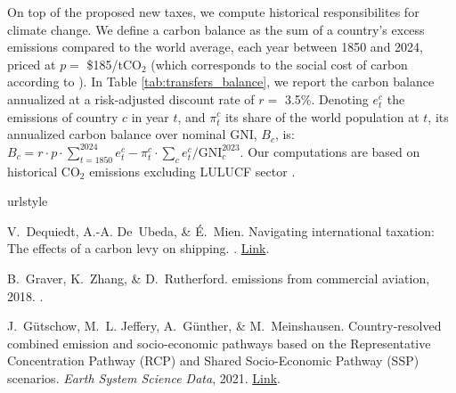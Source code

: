 \documentclass[12pt,english]{article}
\begin{document}
\begin{bibunit}
On top of the proposed new taxes, we compute historical responsibilites for climate change. We define a carbon balance as the sum of a country's excess emissions compared to the world average, each year between 1850 and 2024, priced at $p=$ \$185/tCO$_\text{2}$ (which corresponds to the social cost of carbon according to \citealp{rennert_comprehensive_2022}). 
In Table \ref{tab:transfers_balance}, we report the carbon balance annualized at a risk-adjusted discount rate of $r =$ 3.5\%. Denoting $e_t^c$ the emissions of country $c$ in year $t$, and $\pi_t^c$ its share of the world population at $t$, its annualized carbon balance over nominal GNI, $B_c$, is: $ B_c = r \cdot p \cdot \sum_{t=1850}^{2024} e_t^c - \pi_t^c \cdot \sum_c e_t^c / \text{GNI}_c^{2023}\text{.}$ Our computations are based on historical CO$_\text{2}$ emissions excluding LULUCF sector \citep{gutschow_country-resolved_2021}.

\clearpage
\renewcommand{\url}[1]{\href{#1}{Link}} 

\begin{thebibliography}{7}
\providecommand{\natexlab}[1]{#1}
\providecommand{\url}[1]{\texttt{#1}}
\expandafter\ifx\csname urlstyle\endcsname\relax
  \providecommand{\doi}[1]{doi: #1}\else
  \providecommand{\doi}{doi: \begingroup \urlstyle{rm}\Url}\fi

V.~Dequiedt, A.-A. De~Ubeda, \& {\'E}.~Mien.
\newblock Navigating international taxation: {{The}} effects of a carbon levy
  on shipping.
.
\newblock \url{https://hal.science/hal-04573868}.

B.~Graver, K.~Zhang, \& D.~Rutherford.
 emissions from commercial aviation, 2018.
.

J.~G{\"u}tschow, M.~L. Jeffery, A.~G{\"u}nther, \& M.~Meinshausen.
\newblock Country-resolved combined emission and socio-economic pathways based
  on the {{Representative Concentration Pathway}} ({{RCP}}) and {{Shared
  Socio-Economic Pathway}} ({{SSP}}) scenarios.
\newblock \emph{Earth System Science Data}, 2021.
\newblock \url{https://essd.copernicus.org/articles/13/1005/2021/}.


\end{thebibliography}
\end{bibunit}
\end{document}
